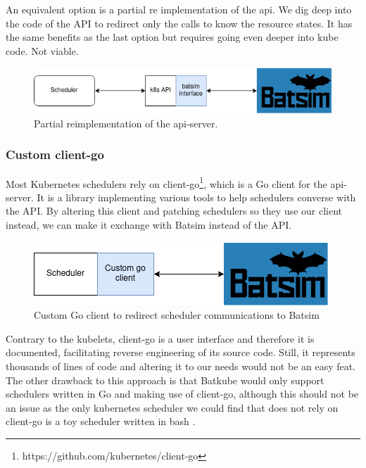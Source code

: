 An equivalent option is a partial re implementation of the api. We dig deep
into the code of the API to redirect only the calls to know the resource
states. It has the same benefits as the last option but requires going even
deeper into kube code. Not viable.

\begin{figure}[h]
	\centering
	\includegraphics[width=\textwidth]{imgs/partial-reimplem.png}
	\caption{Partial reimplementation of the api-server.}
	\label{fig:partial_reimp}
\end{figure}

\subsubsection{Custom client-go}

Most Kubernetes schedulers rely on
client-go\footnote{https://github.com/kubernetes/client-go}, which is a Go
client for the api-server. It is a library implementing various tools to help
schedulers converse with the API. By altering this client and patching
schedulers so they use our client instead, we can make it exchange with Batsim
instead of the API. 

\begin{figure}[h]
	\centering
	\includegraphics{imgs/custom-go-client.png}
	\caption{Custom Go client to redirect scheduler communications to Batsim}
	\label{fig:custom-go-client}
\end{figure}

Contrary to the kubelets, client-go is a user interface and therefore it is
documented, facilitating reverse engineering of its source code. Still, it
represents thousands of lines of code and altering it to our needs would not be
an easy feat.  The other drawback to this approach is that Batkube would only
support schedulers written in Go and making use of client-go, although this
should not be an issue as the only kubernetes scheduler we could find that does
not rely on client-go is a toy scheduler written in bash \cite{bash-scheduler}.

